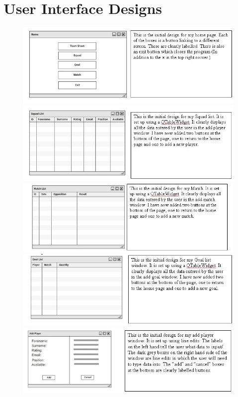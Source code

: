 \section{User Interface Designs}
\begin{figure}[H]
	\includegraphics{HomeUifTxt}
	\includegraphics{SquadListUifTxt}
	\includegraphics{MatchListUifTxt}
	\includegraphics{GoalListUifTxt}
	\includegraphics{addPlayerUifTxt}

\end{figure}
